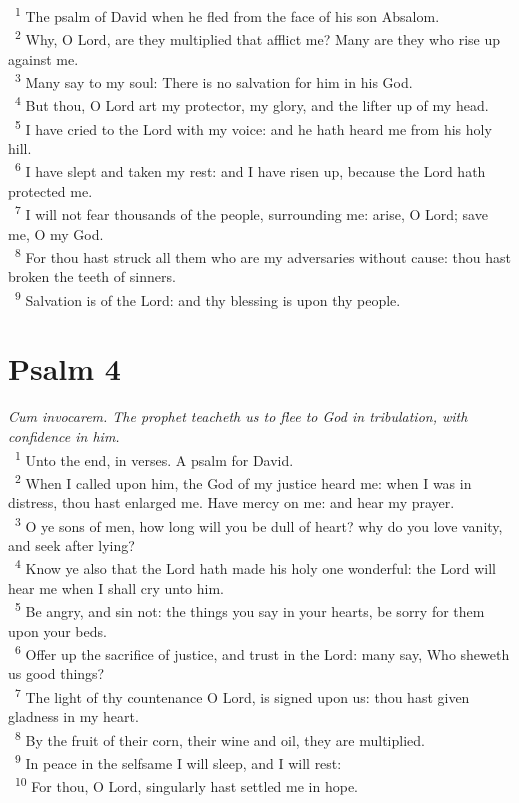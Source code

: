 \documentclass[a5paper,12pt]{article}
\begin{document}
\begin{multicols*}{2}
~\textsuperscript{1} The psalm of David when he fled from the face of his son Absalom.\\
~\textsuperscript{2} Why, O Lord, are they multiplied that afflict me? Many are they who rise up against me.\\
~\textsuperscript{3} Many say to my soul: There is no salvation for him in his God.\\
~\textsuperscript{4} But thou, O Lord art my protector, my glory, and the lifter up of my head.\\
~\textsuperscript{5} I have cried to the Lord with my voice: and he hath heard me from his holy hill.\\
~\textsuperscript{6} I have slept and taken my rest: and I have risen up, because the Lord hath protected me.\\
~\textsuperscript{7} I will not fear thousands of the people, surrounding me: arise, O Lord; save me, O my God.\\
~\textsuperscript{8} For thou hast struck all them who are my adversaries without cause: thou hast broken the teeth of sinners.\\
~\textsuperscript{9} Salvation is of the Lord: and thy blessing is upon thy people.\\

\section{Psalm 4}
\label{sec:org3936df1}
\emph{Cum invocarem. The prophet teacheth us to flee to God in tribulation, with confidence in him.}\\

~\textsuperscript{1} Unto the end, in verses. A psalm for David.\\
~\textsuperscript{2} When I called upon him, the God of my justice heard me: when I was in distress, thou hast enlarged me. Have mercy on me: and hear my prayer.\\
~\textsuperscript{3} O ye sons of men, how long will you be dull of heart? why do you love vanity, and seek after lying?\\
~\textsuperscript{4} Know ye also that the Lord hath made his holy one wonderful: the Lord will hear me when I shall cry unto him.\\
~\textsuperscript{5} Be angry, and sin not: the things you say in your hearts, be sorry for them upon your beds.\\
~\textsuperscript{6} Offer up the sacrifice of justice, and trust in the Lord: many say, Who sheweth us good things?\\
~\textsuperscript{7} The light of thy countenance O Lord, is signed upon us: thou hast given gladness in my heart.\\
~\textsuperscript{8} By the fruit of their corn, their wine and oil, they are multiplied.\\
~\textsuperscript{9} In peace in the selfsame I will sleep, and I will rest:\\
~\textsuperscript{10} For thou, O Lord, singularly hast settled me in hope.\\


\end{multicols*}
\end{document}
